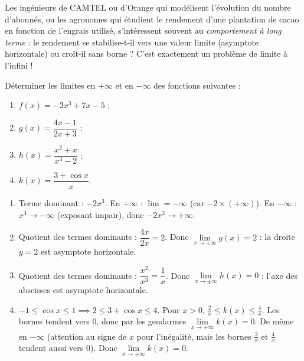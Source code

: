 \documentclass[11pt]{article}
\begin{document}
\begin{savaistu}
Les ingénieurs de CAMTEL ou d'Orange qui modélisent l'évolution du nombre d'abonnés, ou les agronomes qui étudient le rendement d'une plantation de cacao en fonction de l'engrais utilisé, s'intéressent souvent au \emph{comportement à long terme} : le rendement se stabilise-t-il vers une valeur limite (asymptote horizontale) ou croît-il sans borne ? C'est exactement un problème de limite à l'infini !
\end{savaistu}

\begin{exercice}
Déterminer les limites en $+\infty$ et en $-\infty$ des fonctions suivantes :
\begin{enumerate}
\item $f(x) = -2x^3 + 7x - 5$ ;
\item $g(x) = \dfrac{4x - 1}{2x + 3}$ ;
\item $h(x) = \dfrac{x^2 + x}{x^3 - 2}$ ;
\item $k(x) = \dfrac{3 + \cos x}{x}$.
\end{enumerate}
\end{exercice}

\begin{corrige}[Exercice]
\begin{enumerate}
\item Terme dominant : $-2x^3$. En $+\infty$ : $\lim = -\infty$ (car $-2 \times (+\infty)$). En $-\infty$ : $x^3 \to -\infty$ (exposant impair), donc $-2x^3 \to +\infty$.
\item Quotient des termes dominants : $\dfrac{4x}{2x} = 2$. Donc $\lim\limits_{x \to \pm\infty} g(x) = 2$ : la droite $y = 2$ est asymptote horizontale.
\item Quotient des termes dominants : $\dfrac{x^2}{x^3} = \dfrac{1}{x}$. Donc $\lim\limits_{x \to \pm\infty} h(x) = 0$ : l'axe des abscisses est asymptote horizontale.
\item $-1 \le \cos x \le 1 \implies 2 \le 3+\cos x \le 4$. Pour $x>0$, $\frac{2}{x} \le k(x) \le \frac{4}{x}$. Les bornes tendent vers $0$, donc par les gendarmes $\lim\limits_{x\to+\infty} k(x)=0$. De même en $-\infty$ (attention au signe de $x$ pour l'inégalité, mais les bornes $\frac{2}{x}$ et $\frac{4}{x}$ tendent aussi vers $0$). Donc $\lim\limits_{x\to\pm\infty} k(x)=0$.
\end{enumerate}
\end{corrige}
\end{document}

